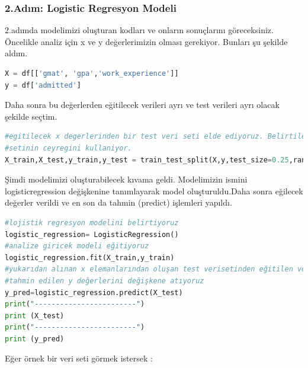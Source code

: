 \documentclass{article}
\begin{document}
\newpage

\subsubsection{2.Adım: Logistic Regresyon Modeli}
\hspace{1cm}2.adımda modelimizi oluşturan kodları  ve onların sonuçlarını göreceksiniz.\\
Öncelikle analiz için x ve y değerlerimizin olması gerekiyor. Bunları şu şekilde aldım.

\begin{lstlisting}[language=Python, caption=x ve y Değerleri]
X = df[['gmat', 'gpa','work_experience']]
y = df['admitted']
\end{lstlisting}

Daha sonra bu değerlerden eğitilecek verileri ayrı ve test verileri ayrı olacak şekilde seçtim.

\begin{lstlisting}[language=Python, caption=Kullanılacak verilerin ayrıştırılması]
#egitilecek x degerlerinden bir test veri seti elde ediyoruz. Belirtilen test_size = veri
#setinin ceyregini kullaniyor.
X_train,X_test,y_train,y_test = train_test_split(X,y,test_size=0.25,random_state=0)
\end{lstlisting}

\par Şimdi modelimizi oluşturabilecek kıvama geldi. Modelimizin ismini logisticregression değişkenine tanımlayarak model oluşturuldu.Daha sonra eğilecek değerler verildi ve en son da tahmin (predict) işlemleri yapıldı.

\begin{lstlisting}[language=Python, caption=Logistic Regression]
#lojistik regresyon modelini belirtiyoruz
logistic_regression= LogisticRegression()
#analize giricek modeli eğitiyoruz
logistic_regression.fit(X_train,y_train)
#yukarıdan alınan x elemanlarından oluşan test verisetinden eğitilen ve 
#tahmin edilen y değerlerini değişkene atıyoruz
y_pred=logistic_regression.predict(X_test)
print("------------------------")
print (X_test) 
print("------------------------")
print (y_pred)
\end{lstlisting}
Eğer örnek bir veri seti görmek istersek :
\end{document}
